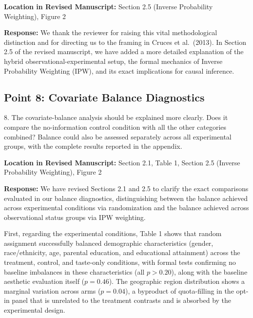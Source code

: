 \documentclass[11pt, letterpaper]{article}
\begin{document}
\textbf{Location in Revised Manuscript:} Section 2.5 (Inverse Probability Weighting), Figure 2

\textbf{Response:}
We thank the reviewer for raising this vital methodological distinction and for directing us to the framing in Cruces et al.~(2013). In Section 2.5 of the revised manuscript, we have added a more detailed explanation of the hybrid observational-experimental setup, the formal mechanics of Inverse Probability Weighting (IPW), and its exact implications for causal inference.

\vspace{10pt}

\subsection*{Point 8: Covariate Balance Diagnostics}

\begin{reviewercomment}
8. The covariate-balance analysis should be explained more clearly. Does it compare the no-information control condition with all the other categories combined? Balance could also be assessed separately across all experimental groups, with the complete results reported in the appendix.
\end{reviewercomment}

\textbf{Location in Revised Manuscript:} Section 2.1, Table 1, Section 2.5 (Inverse Probability Weighting), Figure 2

\textbf{Response:}
We have revised Sections 2.1 and 2.5 to clarify the exact comparisons evaluated in our balance diagnostics, distinguishing between the balance achieved across experimental conditions via randomization and the balance achieved across observational status groups via IPW weighting.

First, regarding the experimental conditions, Table 1 shows that random assignment successfully balanced demographic characteristics (gender, race/ethnicity, age, parental education, and educational attainment) across the treatment, control, and taste-only conditions, with formal tests confirming no baseline imbalances in these characteristics (all $p > 0.20$), along with the baseline aesthetic evaluation itself ($p = 0.46$). The geographic region distribution shows a marginal variation across arms ($p = 0.04$), a byproduct of quota-filling in the opt-in panel that is unrelated to the treatment contrasts and is absorbed by the experimental design.
\end{document}
